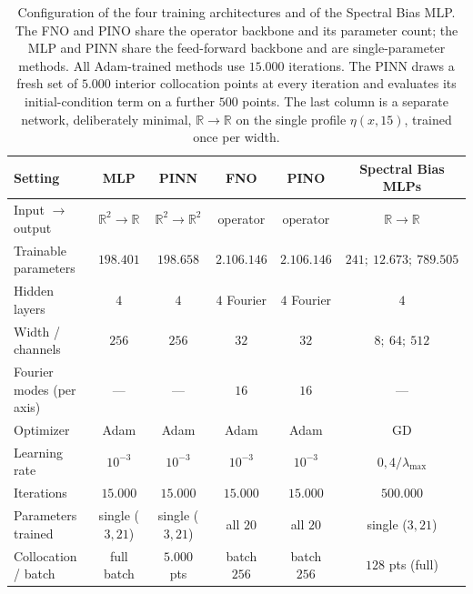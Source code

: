 \begin{table}[htbp]
    \centering
    \caption{Configuration of the four training architectures and of the Spectral Bias MLP. The FNO and PINO share the operator backbone and its parameter count; the MLP and PINN share the feed-forward backbone and are single-parameter methods. All Adam-trained methods use $15.000$ iterations. The PINN draws a fresh set of $5.000$ interior collocation points at every iteration and evaluates its initial-condition term on a further $500$ points. The last column is a separate network, deliberately minimal, $\mathbb{R} \to \mathbb{R}$ on the single profile $\eta(x, 15)$, trained once per width.}
    \label{tab:m_config}
    \footnotesize
    \setlength{\tabcolsep}{2pt}
    \begin{tabular}{@{}lccccc@{}}
        \hline
        \textbf{Setting} & \textbf{MLP} & \textbf{PINN} & \textbf{FNO} & \textbf{PINO} & \textbf{Spectral Bias MLPs} \\
        \hline
        Input $\to$ output        & $\mathbb{R}^2 \to \mathbb{R}$ & $\mathbb{R}^2 \to \mathbb{R}^2$ & operator & operator & $\mathbb{R} \to \mathbb{R}$ \\
        Trainable parameters      & $198.401$ & $198.658$ & $2.106.146$ & $2.106.146$ & $241;\ 12.673;\ 789.505$ \\
        Hidden layers             & $4$         & $4$         & $4$ Fourier     & $4$ Fourier     & $4$ \\
        Width / channels          & $256$       & $256$       & $32$            & $32$            & $8;\ 64;\ 512$ \\
        Fourier modes (per axis)  & ---         & ---         & $16$            & $16$            & --- \\
        Optimizer                 & Adam        & Adam        & Adam            & Adam            & GD \\
        Learning rate             & $10^{-3}$   & $10^{-3}$   & $10^{-3}$       & $10^{-3}$       & $0{,}4/\lambda_{\max}$ \\
        Iterations                & $15.000$  & $15.000$  & $15.000$      & $15.000$      & $500.000$ \\
        Parameters trained        & single ($3{,}21$) & single ($3{,}21$) & all $20$    & all $20$        & single ($3{,}21$) \\
        Collocation / batch       & full batch  & $5.000$ pts & batch $256$    & batch $256$    & $128$ pts (full) \\

\end{tabular}
\end{table}
